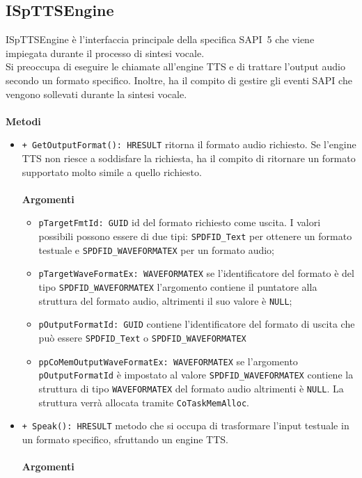 \subsection{ISpTTSEngine}
ISpTTSEngine è l'interfaccia principale della specifica SAPI~5 che viene impiegata durante il processo di sintesi vocale.\\
Si preoccupa di eseguire le chiamate all'engine TTS e di trattare l'output audio secondo un formato specifico. Inoltre, ha il compito di gestire gli eventi SAPI che vengono sollevati durante la sintesi vocale.
\\\\
\textbf{Metodi}
\begin{itemize}
	\item \texttt{+ GetOutputFormat(): HRESULT} ritorna il formato audio richiesto. Se l'engine TTS non riesce a soddisfare la richiesta, ha il compito di ritornare un formato supportato molto simile a quello richiesto.
	\\\\
	\textbf{Argomenti}
	\begin{itemize}
		\item \texttt{pTargetFmtId: GUID} id del formato richiesto come uscita. I valori possibili possono essere di due tipi: \texttt{SPDFID\_Text} per ottenere un formato testuale e \texttt{SPDFID\_WAVEFORMATEX} per un formato audio;
		\item \texttt{pTargetWaveFormatEx: WAVEFORMATEX} se l'identificatore del formato è del tipo \texttt{SPDFID\_WAVEFORMATEX} l'argomento contiene il puntatore alla struttura del formato audio, altrimenti il suo valore è \texttt{NULL};
		\item \texttt{pOutputFormatId: GUID} contiene l'identificatore del formato di uscita che può essere \texttt{SPDFID\_Text} o \texttt{SPDFID\_WAVEFORMATEX}
		\item \texttt{ppCoMemOutputWaveFormatEx: WAVEFORMATEX} se l'argomento\\ \texttt{pOutputFormatId} è impostato al valore \texttt{SPDFID\_WAVEFORMATEX} contiene la struttura di tipo \texttt{WAVEFORMATEX} del formato audio altrimenti è \texttt{NULL}. La struttura verrà allocata tramite \texttt{CoTaskMemAlloc}.
	\end{itemize}
	\item \texttt{+ Speak(): HRESULT} metodo che si occupa di trasformare l'input testuale in un formato specifico, sfruttando un engine TTS. 
	\\\\
	\textbf{Argomenti}

\end{itemize}

